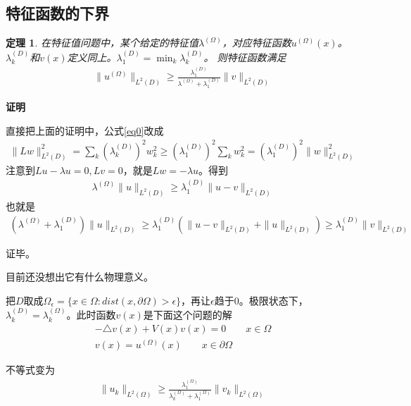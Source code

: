 \documentclass[12pt,a4paper]{article}
\newtheorem{theorem}{定理}
\begin{document}
\subsection{特征函数的下界}

\begin{theorem}

在特征值问题中，某个给定的特征值$\lambda^{(\Omega)}$，对应特征函数$u^{(\Omega)}(x)$。$\lambda_k^{(D)}$和$v(x)$定义同上。$\lambda_1^{(D)} = \min_k \lambda_k^{(D)}$。
则特征函数满足
\begin{align}
\|u^{(\Omega)}\|_{L^2(D)} \geq \frac{\lambda_1^{(D)}}{\lambda^{(\Omega)} + \lambda_1^{(D)}} \|v\|_{L^2(D)}
\end{align}

\end{theorem}

\textbf{证明}

直接把上面的证明中，公式\ref{eq0}改成
\begin{align}
\|L w\|_{L^2(D)}^2 = \sum_k (\lambda_k^{(D)})^2 w_k^2 \geq (\lambda_1^{(D)})^2 \sum_k w_k^2 = (\lambda_1^{(D)})^2 \|w\|_{L^2(D)}^2
\end{align}
注意到$L u - \lambda u = 0, L v = 0$，就是$L w = - \lambda u$。得到
\begin{align}
\lambda^{(\Omega)} \|u\|_{L^2(D)} \geq \lambda_1^{(D)} \|u - v\|_{L^2(D)}
\end{align}
也就是
\begin{align}
(\lambda^{(\Omega)} + \lambda_1^{(D)}) \|u\|_{L^2(D)} \geq \lambda_1^{(D)} (\|u - v\|_{L^2(D)} + \|u\|_{L^2(D)}) \geq \lambda_1^{(D)} \|v\|_{L^2(D)}
\end{align}

证毕。

目前还没想出它有什么物理意义。

把$D$取成$\Omega_{\epsilon} = \{x \in \Omega : dist(x, \partial \Omega) > \epsilon\}$，再让$\epsilon$趋于0。极限状态下，$\lambda_k^{(D)} = \lambda_k^{(\Omega)}$。此时函数$v(x)$是下面这个问题的解
\begin{align}
-\triangle v(x) + V(x) v(x) = 0 \qquad x \in \Omega \\
v(x) = u^{(\Omega)}(x) \qquad x \in \partial \Omega
\end{align}

不等式变为
\begin{align}
\|u_k\|_{L^2(\Omega)} \geq \frac{\lambda_1^{(\Omega)}}{\lambda_k^{(\Omega)} + \lambda_1^{(\Omega)}} \|v_k\|_{L^2(\Omega)}
\end{align}
\end{document}
